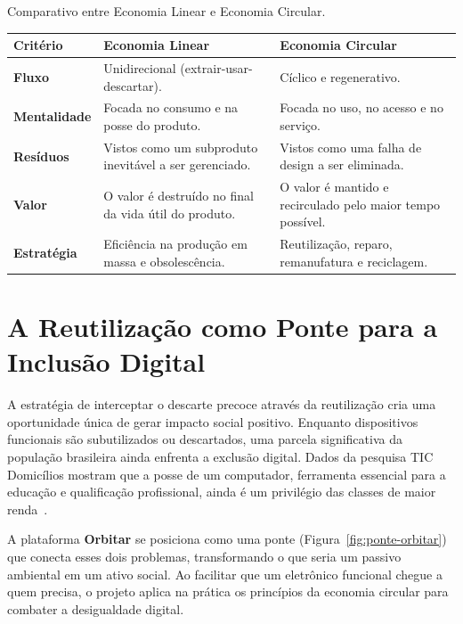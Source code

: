 \documentclass[
	12pt,				%
	openright,			%
	oneside,			%
	a4paper,			%
	english,			%
	brazil				%
	]{abntex2}
\theoremstyle{definition}
\begin{document}
\begin{quadro}[H] %
    \caption{Comparativo entre Economia Linear e Economia Circular.}
    \label{quadro:linear-vs-circular}
    \begin{tabularx}{\textwidth}{lXX}
        \toprule %
        \textbf{Critério} & \textbf{Economia Linear} & \textbf{Economia Circular} \\
        \midrule %
        \textbf{Fluxo} & Unidirecional (extrair-usar-descartar). & Cíclico e regenerativo. \\
        \textbf{Mentalidade} & Focada no consumo e na posse do produto. & Focada no uso, no acesso e no serviço. \\
        \textbf{Resíduos} & Vistos como um subproduto inevitável a ser gerenciado. & Vistos como uma falha de design a ser eliminada. \\
        \textbf{Valor} & O valor é destruído no final da vida útil do produto. & O valor é mantido e recirculado pelo maior tempo possível. \\
        \textbf{Estratégia} & Eficiência na produção em massa e obsolescência. & Reutilização, reparo, remanufatura e reciclagem. \\
        \bottomrule %
    \end{tabularx}
\end{quadro}

\section{A Reutilização como Ponte para a Inclusão Digital}

A estratégia de interceptar o descarte precoce através da reutilização cria uma oportunidade única de gerar impacto social positivo. Enquanto dispositivos funcionais são subutilizados ou descartados, uma parcela significativa da população brasileira ainda enfrenta a exclusão digital. Dados da pesquisa TIC Domicílios mostram que a posse de um computador, ferramenta essencial para a educação e qualificação profissional, ainda é um privilégio das classes de maior renda~\cite{cgi2024}.

A plataforma \textbf{Orbitar} se posiciona como uma ponte (Figura~\ref{fig:ponte-orbitar}) que conecta esses dois problemas, transformando o que seria um passivo ambiental em um ativo social. Ao facilitar que um eletrônico funcional chegue a quem precisa, o projeto aplica na prática os princípios da economia circular para combater a desigualdade digital.
\end{document}
